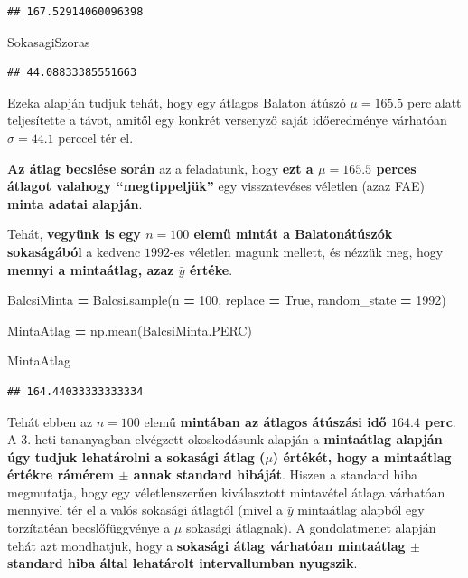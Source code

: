 \documentclass[
]{book}
\newenvironment{Shaded}{\begin{snugshade}}{\end{snugshade}}
\newcommand{\DecValTok}[1]{\textcolor[rgb]{0.00,0.00,0.81}{#1}}
\newcommand{\NormalTok}[1]{#1}
\newcommand{\OperatorTok}[1]{\textcolor[rgb]{0.81,0.36,0.00}{\textbf{#1}}}
\newcommand{\VariableTok}[1]{\textcolor[rgb]{0.00,0.00,0.00}{#1}}
\begin{document}
\begin{verbatim}
## 167.52914060096398
\end{verbatim}

\begin{Shaded}
\begin{Highlighting}[]
\NormalTok{SokasagiSzoras}
\end{Highlighting}
\end{Shaded}

\begin{verbatim}
## 44.08833385551663
\end{verbatim}

Ezeka alapján tudjuk tehát, hogy egy átlagos Balaton átúszó \(\mu=165.5\) perc alatt teljesítette a távot, amitől egy konkrét versenyző saját időeredménye várhatóan \(\sigma=44.1\) perccel tér el.

\textbf{Az átlag becslése során} az a feladatunk, hogy \textbf{ezt a \(\mu=165.5\) perces átlagot valahogy ``megtippeljük''} egy visszatevéses véletlen (azaz FAE) \textbf{minta adatai alapján}.

Tehát, \textbf{vegyünk is egy \(n=100\) elemű mintát a Balatonátúszók sokaságából} a kedvenc \(1992\)-es véletlen magunk mellett, és nézzük meg, hogy \textbf{mennyi a mintaátlag, azaz \(\bar{y}\) értéke}.

\begin{Shaded}
\begin{Highlighting}[]
\NormalTok{BalcsiMinta }\OperatorTok{=}\NormalTok{ Balcsi.sample(n }\OperatorTok{=} \DecValTok{100}\NormalTok{, replace }\OperatorTok{=} \VariableTok{True}\NormalTok{, random\_state }\OperatorTok{=} \DecValTok{1992}\NormalTok{)}

\NormalTok{MintaAtlag }\OperatorTok{=}\NormalTok{ np.mean(BalcsiMinta.PERC)}

\NormalTok{MintaAtlag}
\end{Highlighting}
\end{Shaded}

\begin{verbatim}
## 164.44033333333334
\end{verbatim}

Tehát ebben az \(n=100\) elemű \textbf{mintában az átlagos átúszási idő \(164.4\) perc}. A 3. heti tananyagban elvégzett okoskodásunk alapján a \textbf{mintaátlag alapján úgy tudjuk lehatárolni a sokasági átlag (\(\mu\)) értékét, hogy a mintaátlag értékre rámérem \(\pm\) annak standard hibáját}. Hiszen a standard hiba megmutatja, hogy egy véletlenszerűen kiválasztott mintavétel átlaga várhatóan mennyivel tér el a valós sokasági átlagtól (mivel a \(\bar{y}\) mintaátlag alapból egy torzítatéan becslőfüggvénye a \(\mu\) sokasági átlagnak).
A gondolatmenet alapján tehát azt mondhatjuk, hogy a \textbf{sokasági átlag várhatóan mintaátlag \(\pm\) standard hiba által lehatárolt intervallumban nyugszik}.
\end{document}

